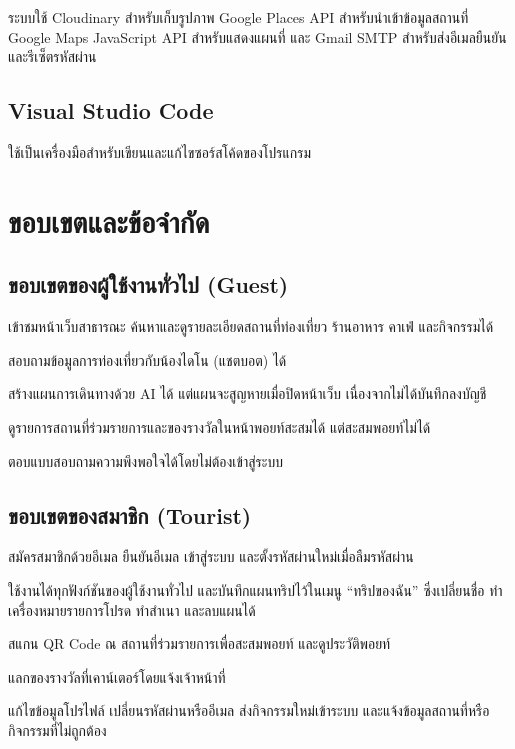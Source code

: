 ระบบใช้ Cloudinary สำหรับเก็บรูปภาพ Google Places API สำหรับนำเข้าข้อมูลสถานที่ Google Maps JavaScript API สำหรับแสดงแผนที่ และ Gmail SMTP สำหรับส่งอีเมลยืนยันและรีเซ็ตรหัสผ่าน

\subsection{Visual Studio Code}

ใช้เป็นเครื่องมือสำหรับเขียนและแก้ไขซอร์สโค้ดของโปรแกรม

\clearpage
\section{ขอบเขตและข้อจำกัด}

\subsection{ขอบเขตของผู้ใช้งานทั่วไป (Guest)}

\begin{parenlist}
\item เข้าชมหน้าเว็บสาธารณะ ค้นหาและดูรายละเอียดสถานที่ท่องเที่ยว ร้านอาหาร คาเฟ่ และกิจกรรมได้
\item สอบถามข้อมูลการท่องเที่ยวกับน้องไดโน (แชตบอต) ได้
\item สร้างแผนการเดินทางด้วย AI ได้ แต่แผนจะสูญหายเมื่อปิดหน้าเว็บ เนื่องจากไม่ได้บันทึกลงบัญชี
\item ดูรายการสถานที่ร่วมรายการและของรางวัลในหน้าพอยท์สะสมได้ แต่สะสมพอยท์ไม่ได้
\item ตอบแบบสอบถามความพึงพอใจได้โดยไม่ต้องเข้าสู่ระบบ
\end{parenlist}

\subsection{ขอบเขตของสมาชิก (Tourist)}

\begin{parenlist}
\item สมัครสมาชิกด้วยอีเมล ยืนยันอีเมล เข้าสู่ระบบ และตั้งรหัสผ่านใหม่เมื่อลืมรหัสผ่าน
\item ใช้งานได้ทุกฟังก์ชันของผู้ใช้งานทั่วไป และบันทึกแผนทริปไว้ในเมนู ``ทริปของฉัน'' ซึ่งเปลี่ยนชื่อ ทำเครื่องหมายรายการโปรด ทำสำเนา และลบแผนได้
\item สแกน QR Code ณ สถานที่ร่วมรายการเพื่อสะสมพอยท์ และดูประวัติพอยท์
\item แลกของรางวัลที่เคาน์เตอร์โดยแจ้งเจ้าหน้าที่
\item แก้ไขข้อมูลโปรไฟล์ เปลี่ยนรหัสผ่านหรืออีเมล ส่งกิจกรรมใหม่เข้าระบบ และแจ้งข้อมูลสถานที่หรือกิจกรรมที่ไม่ถูกต้อง
\end{parenlist}

